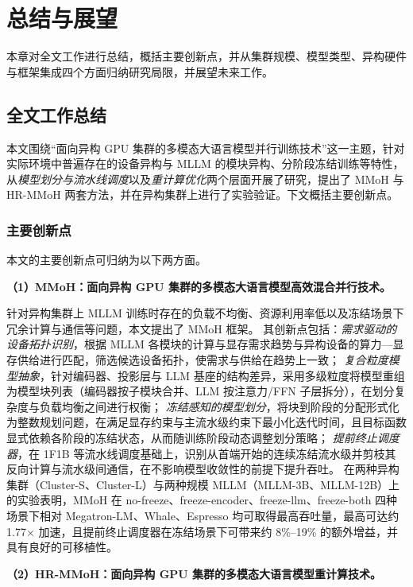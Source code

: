 \chapter{总结与展望}

本章对全文工作进行总结，概括主要创新点，并从集群规模、模型类型、异构硬件与框架集成四个方面归纳研究局限，并展望未来工作。

\section{全文工作总结}

本文围绕“面向异构 GPU 集群的多模态大语言模型并行训练技术”这一主题，针对实际环境中普遍存在的设备异构与 MLLM 的模块异构、分阶段冻结训练等特性，从\emph{模型划分与流水线调度}以及\emph{重计算优化}两个层面开展了研究，提出了 MMoH 与 HR-MMoH 两套方法，并在异构集群上进行了实验验证。下文概括主要创新点。

\subsection{主要创新点}

本文的主要创新点可归纳为以下两方面。

\textbf{（1）MMoH：面向异构 GPU 集群的多模态大语言模型高效混合并行技术。}

针对异构集群上 MLLM 训练时存在的负载不均衡、资源利用率低以及冻结场景下冗余计算与通信等问题，本文提出了 MMoH 框架。
其创新点包括：\emph{需求驱动的设备拓扑识别}，根据 MLLM 各模块的计算与显存需求趋势与异构设备的算力—显存供给进行匹配，筛选候选设备拓扑，使需求与供给在趋势上一致；
\emph{复合粒度模型抽象}，针对编码器、投影层与 LLM 基座的结构差异，采用多级粒度将模型重组为模型块列表（编码器按子模块合并、LLM 按注意力/FFN 子层拆分），在划分复杂度与负载均衡之间进行权衡；
\emph{冻结感知的模型划分}，将块到阶段的分配形式化为整数规划问题，在满足显存约束与主流水级约束下最小化迭代时间，且目标函数显式依赖各阶段的冻结状态，从而随训练阶段动态调整划分策略；
\emph{提前终止调度器}，在 1F1B 等流水线调度基础上，识别从首端开始的连续冻结流水级并剪枝其反向计算与流水级间通信，在不影响模型收敛性的前提下提升吞吐。
在两种异构集群（Cluster-S、Cluster-L）与两种规模 MLLM（MLLM-3B、MLLM-12B）上的实验表明，MMoH 在 no-freeze、freeze-encoder、freeze-llm、freeze-both 四种场景下相对 Megatron-LM、Whale、Espresso 均可取得最高吞吐量，最高可达约 1.77$\times$ 加速，且提前终止调度器在冻结场景下可带来约 8\%--19\% 的额外增益，并具有良好的可移植性。

\textbf{（2）HR-MMoH：面向异构 GPU 集群的多模态大语言模型重计算技术。}

